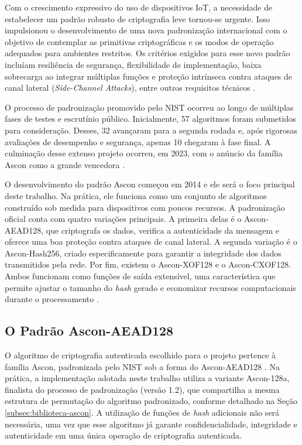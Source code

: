 Com o crescimento expressivo do uso de dispositivos IoT, a necessidade de estabelecer um padrão robusto de criptografia leve tornou-se urgente. Isso impulsionou o desenvolvimento de uma nova padronização internacional com o objetivo de contemplar as primitivas criptográficas e os modos de operação adequados para ambientes restritos. Os critérios exigidos para esse novo padrão incluíam resiliência de segurança, flexibilidade de implementação, baixa sobrecarga ao integrar múltiplas funções e proteção intrínseca contra ataques de canal lateral (\textit{Side-Channel Attacks}), entre outros requisitos técnicos \cite{nistir8114}.

O processo de padronização promovido pelo NIST ocorreu ao longo de múltiplas fases de testes e escrutínio público. Inicialmente, 57 algoritmos foram submetidos para consideração. Desses, 32 avançaram para a segunda rodada e, após rigorosas avaliações de desempenho e segurança, apenas 10 chegaram à fase final. A culminação desse extenso projeto ocorreu, em 2023, com o anúncio da família Ascon como a grande vencedora \cite{ascon_official}.

O desenvolvimento do padrão Ascon começou em 2014 e ele será o foco principal deste trabalho. Na prática, ele funciona como um conjunto de algoritmos construído sob medida para dispositivos com poucos recursos. A padronização oficial conta com quatro variações principais. A primeira delas é o Ascon-AEAD128, que criptografa os dados, verifica a autenticidade da mensagem e oferece uma boa proteção contra ataques de canal lateral. A segunda variação é o Ascon-Hash256, criado especificamente para garantir a integridade dos dados transmitidos pela rede. Por fim, existem o Ascon-XOF128 e o Ascon-CXOF128. Ambos funcionam como funções de saída extensível, uma característica que permite ajustar o tamanho do \textit{hash} gerado e economizar recursos computacionais durante o processamento \cite{nist2025ascon}.


\subsection{O Padrão Ascon-AEAD128}
O algoritmo de criptografia autenticada escolhido para o projeto pertence à família Ascon, padronizada pelo NIST sob a forma do Ascon-AEAD128 . Na prática, a implementação adotada neste trabalho utiliza a variante Ascon-128a, finalista do processo de padronização (versão 1.2), que compartilha a mesma estrutura de permutação do algoritmo padronizado, conforme detalhado na Seção \ref{subsec:biblioteca-ascon}. A utilização de funções de \textit{hash} adicionais não será necessária, uma vez que esse algoritmo já garante confidencialidade, integridade e autenticidade em uma única operação de criptografia autenticada.

